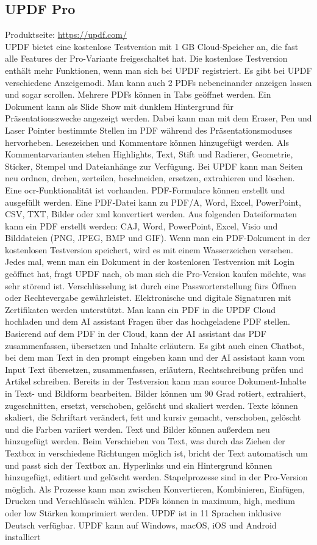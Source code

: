 \subsection{UPDF Pro}
Produktseite: \url{https://updf.com/} \\
UPDF bietet eine kostenlose Testversion mit 1 GB Cloud-Speicher an, die fast alle Features der Pro-Variante freigeschaltet hat. Die kostenlose Testversion enthält mehr Funktionen, wenn man sich bei UPDF registriert. Es gibt bei UPDF verschiedene Anzeigemodi. Man kann auch 2 PDFs nebeneinander anzeigen lassen und sogar scrollen. Mehrere PDFs können in Tabs geöffnet werden. Ein Dokument kann als Slide Show mit dunklem Hintergrund für Präsentationszwecke angezeigt werden. Dabei kann man mit dem Eraser, Pen und Laser Pointer bestimmte Stellen im PDF während des Präsentationsmoduses hervorheben. Lesezeichen und Kommentare können hinzugefügt werden. Als Kommentarvarianten stehen Highlights, Text, Stift und Radierer, Geometrie, Sticker, Stempel und Dateianhänge zur Verfügung. Bei UPDF kann man Seiten neu ordnen, drehen, zerteilen, beschneiden, ersetzen, extrahieren und löschen. Eine \gls{ocr}-Funktionalität ist vorhanden. PDF-Formulare können erstellt und ausgefüllt werden. Eine PDF-Datei kann zu PDF/A, Word, Excel, PowerPoint, CSV, TXT, Bilder oder \gls{xml} konvertiert werden. Aus folgenden Dateiformaten kann ein PDF erstellt werden: CAJ, Word, PowerPoint, Excel, Visio und Bilddateien (PNG, JPEG, BMP und GIF). Wenn man ein PDF-Dokument in der kostenlosen Testversion speichert, wird es mit einem Wasserzeichen versehen. Jedes mal, wenn man ein Dokument in der kostenlosen Testversion mit Login geöffnet hat, fragt UPDF nach, ob man sich die Pro-Version kaufen möchte, was sehr störend ist. Verschlüsselung ist durch eine Passworterstellung fürs Öffnen oder Rechtevergabe gewährleistet. Elektronische und digitale Signaturen mit Zertifikaten werden unterstützt. Man kann ein PDF in die UPDF Cloud hochladen und dem AI assistant Fragen über das hochgeladene PDF stellen. Basierend auf dem PDF in der Cloud, kann der AI assistant das PDF zusammenfassen, übersetzen und Inhalte erläutern. Es gibt auch einen Chatbot, bei dem man Text in den prompt eingeben kann und der AI assistant kann vom Input Text übersetzen, zusammenfassen, erläutern, Rechtschreibung prüfen und Artikel schreiben. Bereits in der Testversion kann man source Dokument-Inhalte in Text- und Bildform bearbeiten. Bilder können um 90 Grad rotiert, extrahiert, zugeschnitten, ersetzt, verschoben, gelöscht und skaliert werden. Texte können skaliert, die Schriftart verändert, fett und kursiv gemacht, verschoben, gelöscht und die Farben variiert werden. Text und Bilder können außerdem neu hinzugefügt werden. Beim Verschieben von Text, was durch das Ziehen der Textbox in verschiedene Richtungen möglich ist, bricht der Text automatisch um und passt sich der Textbox an. Hyperlinks und ein Hintergrund können hinzugefügt, editiert und gelöscht werden. Stapelprozesse sind in der Pro-Version möglich. Als Prozesse kann man zwischen Konvertieren, Kombinieren, Einfügen, Drucken und Verschlüsseln wählen. PDFs können in maximum, high, medium oder low Stärken komprimiert werden. UPDF ist in 11 Sprachen inklusive Deutsch verfügbar. UPDF kann auf Windows, macOS, iOS und Android installiert 